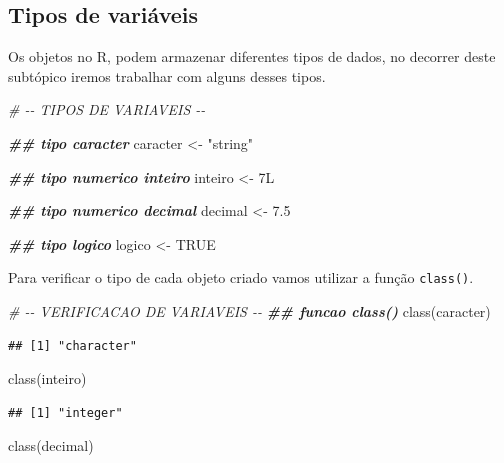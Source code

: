 \documentclass[
]{book}
\newenvironment{Shaded}{\begin{snugshade}}{\end{snugshade}}
\newcommand{\CommentTok}[1]{\textcolor[rgb]{0.56,0.35,0.01}{\textit{#1}}}
\newcommand{\ConstantTok}[1]{\textcolor[rgb]{0.00,0.00,0.00}{#1}}
\newcommand{\DocumentationTok}[1]{\textcolor[rgb]{0.56,0.35,0.01}{\textbf{\textit{#1}}}}
\newcommand{\FloatTok}[1]{\textcolor[rgb]{0.00,0.00,0.81}{#1}}
\newcommand{\FunctionTok}[1]{\textcolor[rgb]{0.00,0.00,0.00}{#1}}
\newcommand{\NormalTok}[1]{#1}
\newcommand{\OtherTok}[1]{\textcolor[rgb]{0.56,0.35,0.01}{#1}}
\newcommand{\StringTok}[1]{\textcolor[rgb]{0.31,0.60,0.02}{#1}}
\begin{document}
\hypertarget{tipos-de-variuxe1veis}{%
\subsection{Tipos de variáveis}\label{tipos-de-variuxe1veis}}

Os objetos no R, podem armazenar diferentes tipos de dados, no decorrer deste subtópico iremos trabalhar com alguns desses tipos.

\begin{Shaded}
\begin{Highlighting}[]
\CommentTok{\# {-}{-} TIPOS DE VARIAVEIS {-}{-}}

\DocumentationTok{\#\# tipo caracter}
\NormalTok{caracter }\OtherTok{\textless{}{-}} \StringTok{"string"}

\DocumentationTok{\#\# tipo numerico inteiro}
\NormalTok{inteiro }\OtherTok{\textless{}{-}}\NormalTok{ 7L}

\DocumentationTok{\#\# tipo numerico decimal}
\NormalTok{decimal }\OtherTok{\textless{}{-}} \FloatTok{7.5}

\DocumentationTok{\#\# tipo logico}
\NormalTok{logico }\OtherTok{\textless{}{-}} \ConstantTok{TRUE}
\end{Highlighting}
\end{Shaded}

Para verificar o tipo de cada objeto criado vamos utilizar a função \texttt{class()}.

\begin{Shaded}
\begin{Highlighting}[]
\CommentTok{\# {-}{-} VERIFICACAO DE VARIAVEIS {-}{-}}
\DocumentationTok{\#\# funcao class()}
\FunctionTok{class}\NormalTok{(caracter)}
\end{Highlighting}
\end{Shaded}

\begin{verbatim}
## [1] "character"
\end{verbatim}

\begin{Shaded}
\begin{Highlighting}[]
\FunctionTok{class}\NormalTok{(inteiro)}
\end{Highlighting}
\end{Shaded}

\begin{verbatim}
## [1] "integer"
\end{verbatim}

\begin{Shaded}
\begin{Highlighting}[]
\FunctionTok{class}\NormalTok{(decimal)}
\end{Highlighting}
\end{Shaded}
\end{document}
